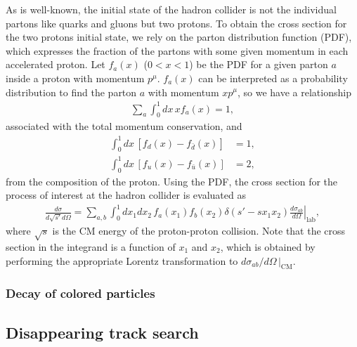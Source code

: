 \documentclass[12pt,twoside,book]{article}
\begin{document}
As is well-known, the initial state of the hadron collider is not the individual partons like quarks and gluons but two protons.
To obtain the cross section for the two protons initial state, we rely on the parton distribution function (PDF), which expresses the fraction of the partons with some given momentum in each accelerated proton.
Let $f_a (x)$ ($0 < x < 1$) be the PDF for a given parton $a$ inside a proton with momentum $p^\mu$.
$f_a (x)$ can be interpreted as a probability distribution to find the parton $a$ with momentum $x p^\mu$, so we have a relationship
\begin{align}
  \sum_a \int_0^1 dx \, x f_a (x) = 1,
\end{align}
associated with the total momentum conservation, and
\begin{align}
  \int_0^1 dx \, \left[ f_d (x) - f_{\bar{d}} (x) \right] &= 1,\\
  \int_0^1 dx \, \left[ f_u (x) - f_{\bar{u}} (x) \right] &= 2,
\end{align}
from the composition of the proton.
Using the PDF, the cross section for the process of interest at the hadron collider is evaluated as
\begin{align}
  \frac{d \sigma}{d \sqrt{s'} d \Omega} =
  \sum_{a,b} \int_0^1 dx_1 dx_2 \, f_a (x_1) f_b (x_2) \delta \left( s' - s x_1 x_2 \right)
  \left. \frac{d \sigma_{a b}}{d \Omega} \right|_{\text{lab}},
\end{align}
where $\sqrt{s}$ is the CM energy of the proton-proton collision.
Note that the cross section in the integrand is a function of $x_1$ and $x_2$, which is obtained by performing the appropriate Lorentz transformation to $\left. d \sigma_{a b} / d \Omega\, \right|_{\text{CM}}$.





\subsubsection*{Decay of colored particles}


\subsection{Disappearing track search}
\label{sec:disappearing_track}





\end{document}
